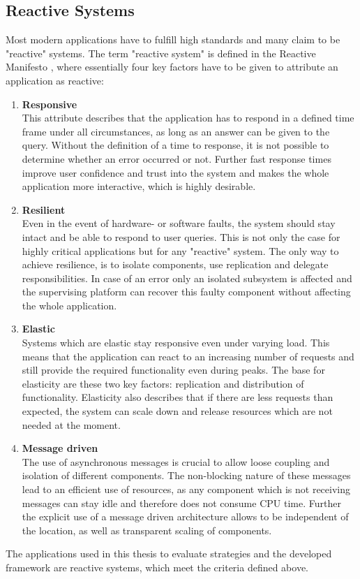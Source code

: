 \subsection{Reactive Systems}
Most modern applications have to fulfill high standards and many claim to be "reactive" systems.
The term "reactive system" is defined in the Reactive Manifesto \cite{reactive_manifesto}, where essentially four key factors have to be given to attribute an application as reactive:
\begin{enumerate}
    \item \textbf{Responsive}\\
          This attribute describes that the application has to respond in a defined time frame under all circumstances, as long as an answer can be given to the query.
          Without the definition of a time to response, it is not possible to determine whether an error occurred or not.
          Further fast response times improve user confidence and trust into the system and makes the whole application more interactive, which is highly desirable.
    \item \textbf{Resilient}\\
          Even in the event of hardware- or software faults, the system should stay intact and be able to respond to user queries.
          This is not only the case for highly critical applications but for any "reactive" system.
          The only way to achieve resilience, is to isolate components, use replication and delegate responsibilities.
          In case of an error only an isolated subsystem is affected and the supervising platform can recover this faulty component without affecting the whole application.
    \item \textbf{Elastic}\\
          Systems which are elastic stay responsive even under varying load.
          This means that the application can react to an increasing number of requests and still provide the required functionality even during peaks.
          The base for elasticity are these two key factors: replication and distribution of functionality.
          Elasticity also describes that if there are less requests than expected, the system can scale down and release resources which are not needed at the moment.
    \item \textbf{Message driven}\\
          The use of asynchronous messages is crucial to allow loose coupling and isolation of different components.
          The non-blocking nature of these messages lead to an efficient use of resources, as any component which is not receiving messages can stay idle and therefore does not consume CPU time.
          Further the explicit use of a message driven architecture allows to be independent of the location, as well as transparent scaling of components.
\end{enumerate}
The applications used in this thesis to evaluate strategies and the developed framework are reactive systems, which meet the criteria defined above.


